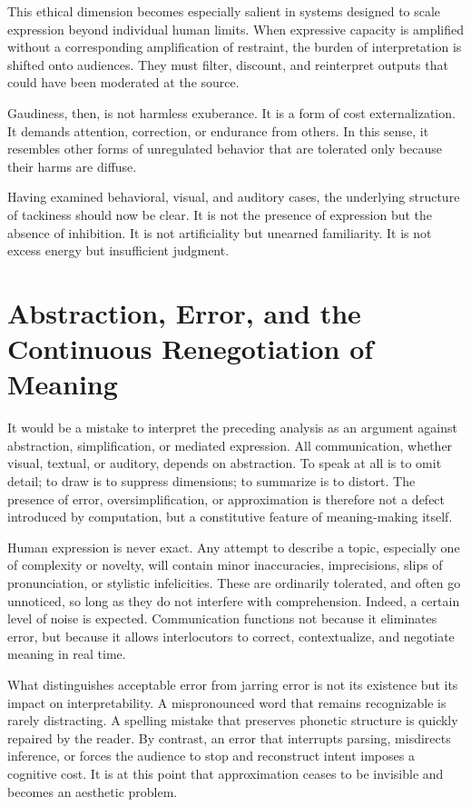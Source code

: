 \documentclass[12pt]{article}
\begin{document}
This ethical dimension becomes especially salient in systems designed to scale expression beyond individual human limits. When expressive capacity is amplified without a corresponding amplification of restraint, the burden of interpretation is shifted onto audiences. They must filter, discount, and reinterpret outputs that could have been moderated at the source.

Gaudiness, then, is not harmless exuberance. It is a form of cost externalization. It demands attention, correction, or endurance from others. In this sense, it resembles other forms of unregulated behavior that are tolerated only because their harms are diffuse.

Having examined behavioral, visual, and auditory cases, the underlying structure of tackiness should now be clear. It is not the presence of expression but the absence of inhibition. It is not artificiality but unearned familiarity. It is not excess energy but insufficient judgment.

\section{Abstraction, Error, and the Continuous Renegotiation of Meaning}

It would be a mistake to interpret the preceding analysis as an argument against abstraction, simplification, or mediated expression. All communication, whether visual, textual, or auditory, depends on abstraction. To speak at all is to omit detail; to draw is to suppress dimensions; to summarize is to distort. The presence of error, oversimplification, or approximation is therefore not a defect introduced by computation, but a constitutive feature of meaning-making itself.

Human expression is never exact. Any attempt to describe a topic, especially one of complexity or novelty, will contain minor inaccuracies, imprecisions, slips of pronunciation, or stylistic infelicities. These are ordinarily tolerated, and often go unnoticed, so long as they do not interfere with comprehension. Indeed, a certain level of noise is expected. Communication functions not because it eliminates error, but because it allows interlocutors to correct, contextualize, and negotiate meaning in real time.

What distinguishes acceptable error from jarring error is not its existence but its impact on interpretability. A mispronounced word that remains recognizable is rarely distracting. A spelling mistake that preserves phonetic structure is quickly repaired by the reader. By contrast, an error that interrupts parsing, misdirects inference, or forces the audience to stop and reconstruct intent imposes a cognitive cost. It is at this point that approximation ceases to be invisible and becomes an aesthetic problem.
\end{document}
